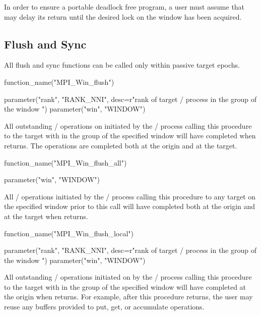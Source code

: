 \begin{users}
In order to ensure a portable deadlock free program, a user must assume
that  may delay its return until the desired lock on the
window has been acquired.
\end{users}

\subsection{Flush and Sync}
\label{sec:1sided-flush}

All flush and sync functions can be called only within passive target
epochs.

%
\begin{mpi-binding}
    function_name("MPI_Win_flush")
    
    parameter("rank", "RANK_NNI", desc=r"rank of target \MPI/ process in the group of the window ")
    parameter("win", "WINDOW")
\end{mpi-binding}

All outstanding \RMA/ operations on  initiated by
the \mpi/ process calling this procedure to the target with  in the group of the specified window
will have completed when  returns. The operations are completed both at
the origin and at the target. 

%
\begin{mpi-binding}
    function_name("MPI_Win_flush_all")
    
    parameter("win", "WINDOW")
\end{mpi-binding}

All \RMA/ operations initiated by the \MPI/ process calling this procedure to any target on the specified window
prior to this call will have
completed both at the origin and at the target when 
returns. 

%
\begin{mpi-binding}
    function_name("MPI_Win_flush_local")
    
    parameter("rank", "RANK_NNI", desc=r"rank of target \MPI/ process in the group of the window ")
    parameter("win", "WINDOW")
\end{mpi-binding}

All outstanding \RMA/ operations
initiated on  by the \mpi/ process calling this procedure to the target with 
in the group of the specified window will have completed at the origin when
 returns. For example, after this procedure returns, the user may
reuse any buffers provided to put, get, or accumulate operations.

